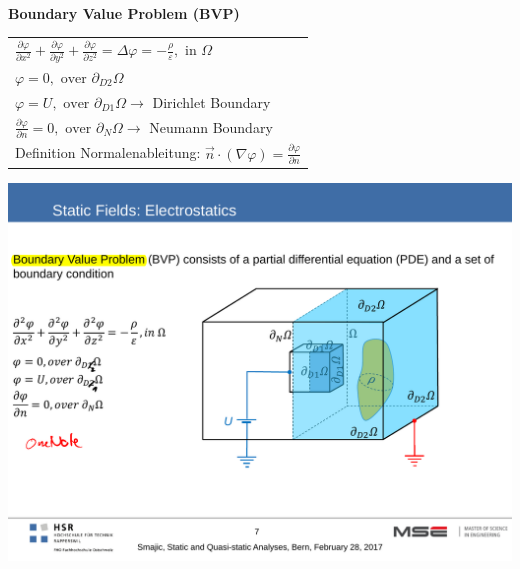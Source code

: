 \textbf{\\ Boundary Value Problem (BVP)\\}
\begin{minipage}[lt]{11cm}
	\begin{tabular}{l}
		\(\displaystyle \frac{\partial \varphi}{\partial x^2} + \frac{\partial \varphi}{\partial y^2} +\frac{\partial \varphi}{\partial z^2} = \Delta \varphi = - \frac{\rho}{\varepsilon}, \textrm{ in } \Omega\) \\
		\(\displaystyle \varphi = 0, \textrm{ over } \partial_{D2} \Omega \) \\
		\(\displaystyle \varphi = U, \textrm{ over } \partial_{D1} \Omega \rightarrow \) Dirichlet Boundary \\
		\(\displaystyle \frac{\partial \varphi}{\partial n} = 0, \textrm{ over } \partial_{N} \Omega \rightarrow \) Neumann Boundary \\	
		Definition Normalenableitung: \(\displaystyle \vec{n} \cdot \left(\nabla \varphi\right) = \frac{\partial \varphi}{\partial n}\)	
	\end{tabular}
\end{minipage}
\begin{minipage}[rt]{8cm}
	\includegraphics[width=.8\textwidth]{./images/BVP_electrostatic.pdf}
\end{minipage}